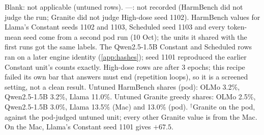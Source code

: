 \documentclass{article}
\begin{document}
\begin{table}[!htbp]
  \smallskip
  \parbox{\textwidth}{\footnotesize\raggedright
    Blank: not applicable (untuned rows). ---: not recorded (HarmBench did not
    judge the run; Granite did not judge High-dose seed 1102). HarmBench
    values for Llama's Constant seeds 1102 and 1103, Scheduled seed 1103 and
    every token-mean seed come from a second pod run (10 Oct); the units it
    shared with the first runs got the same labels. The Qwen2.5-1.5B Constant
    and Scheduled rows ran on a later engine identity (\cref{app:hashes});
    seed 1101 reproduced the earlier Constant unit's counts exactly. High-dose
    rows are after 3 epochs; this recipe failed its own bar that answers must
    end (repetition loops), so it is a screened setting, not a clean result.
    Untuned HarmBench shares (pod): OLMo 3.2\%, Qwen2.5-1.5B 3.2\%, Llama
    11.0\%. Untuned Granite greedy shares: OLMo 2.5\%, Qwen2.5-1.5B 3.0\%,
    Llama 13.5\% (Mac) and 13.0\% (pod). $^{\dagger}$Granite on the pod,
    against the pod-judged untuned unit; every other Granite value is from the
    Mac. On the Mac, Llama's Constant seed 1101 gives $+67.5$.}
\end{table}
\end{document}
